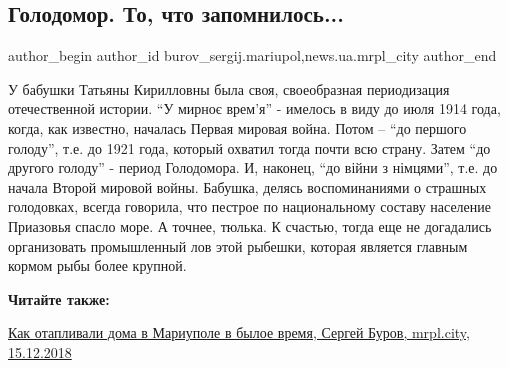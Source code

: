  
 
 
 
 
 
\subsection{Голодомор. То, что запомнилось...}
\label{sec:23_11_2019.stz.news.ua.mrpl_city.1.golodomor_to_chto_zapomnilos}
 
\ifcmt
 author_begin
   author_id burov_sergij.mariupol,news.ua.mrpl_city
 author_end
\fi


У бабушки Татьяны Кирилловны была своя, своеобразная периодизация отечественной
истории. \enquote{У мирноє врем'я} - имелось в виду до июля 1914 года, когда, как
известно, началась Первая мировая война. Потом – \enquote{до першого голоду}, т.е. до
1921 года, который охватил тогда почти всю страну. Затем \enquote{до другого голоду} -
период Голодомора. И, наконец, \enquote{до війни з німцями}, т.е. до начала Второй
мировой войны. Бабушка, делясь воспоминаниями о страшных голодовках, всегда
говорила, что пестрое по национальному составу население Приазовья спасло море.
А точнее, тюлька. К счастью, тогда еще не догадались организовать промышленный
лов этой рыбешки, которая является главным кормом рыбы более крупной.

\textbf{Читайте также:} 

\href{https://mrpl.city/blogs/view/kak-otaplivali-doma-v-mariupole-v-byloe-vremya}{%
Как отапливали дома в Мариуполе в былое время, Сергей Буров, mrpl.city, 15.12.2018}

